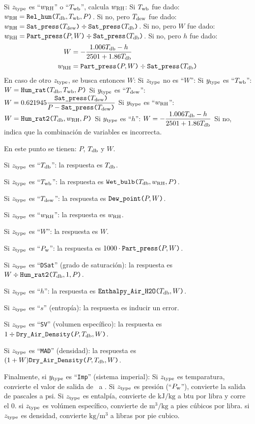 \documentclass[letterpaper]{article}
\newcommand*\Tdb{\ensuremath{T\sub{db}}}
\newcommand*\Twb{\ensuremath{T\sub{wb}}}
\newcommand*\Tdp{\ensuremath{T\sub{dew}}}
\newcommand*\Pw{\ensuremath{P\sub{w}}}
\newcommand*\RH{\ensuremath{w\sub{RH}}}
\begin{document}
Si $z\type$ es ``$\RH$'' o ``$\Twb$'', calcula $\RH$:
\tab Si $\Twb$ fue dado: $\RH=\funcname{Rel\_hum}[\Tdb, \Twb, P]$.
\tab Si no, pero $\Tdp$ fue dado: $\RH=\funcname{Sat\_press}[\Tdp]\div\funcname{Sat\_press}[\Tdb]$.
\tab Si no, pero $W$ fue dado: $\RH=\funcname{Part\_press}[P, W]\div\funcname{Sat\_press}[\Tdb]$.
\tab Si no, pero $h$ fue dado: \begin{align}
	W &= -\frac{1.006 \Tdb - h}{2501 + 1.86 \Tdb} \\
	\RH &= \funcname{Part\_press}[P, W]\div\funcname{Sat\_press}[\Tdb]
\end{align}
En caso de otro $z\type$, se busca entonces $W$:
\tab Si $z\type$ no es ``$W$'':
\tab[2]Si $y\type$ es ``$\Twb$'': $W=\funcname{Hum\_rat}[\Tdb, \Twb, P]$
\tab[2]Si $y\type$ es ``$\Tdp$'': $W=0.621945\dfrac{\funcname{Sat\_press}[\Tdp]}{P-\funcname{Sat\_press}[\Tdp]}$
\tab[2]Si $y\type$ es ``$\RH$'': $W=\funcname{Hum\_rat2}[\Tdb, \RH, P]$
\tab[2]Si $y\type$ es ``$h$'': $W=-\dfrac{1.006 \Tdb - h}{2501 + 1.86 \Tdb}$
\tab Si no, indica que la combinación de variables es incorrecta.

En este punto se tienen: $P$, $\Tdb$ y $W$.

Si $z\type$ es ``$\Tdb$'': la respuesta es $\Tdb$.

Si $z\type$ es ``$\Twb$'': la respuesta es $\funcname{Wet\_bulb}[\Tdb, \RH, P]$.

Si $z\type$ es ``$\Tdp$'': la respuesta es $\funcname{Dew\_point}[P, W]$.

Si $z\type$ es ``$\RH$'': la respuesta es $\RH$.

Si $z\type$ es ``$W$'': la respuesta es $W$.

Si $z\type$ es ``$\Pw$'': la respuesta es $1000\cdot\funcname{Part\_press}[P, W]$.

Si $z\type$ es ``\texttt{DSat}'' (grado de saturación): la respuesta es $W\div\funcname{Hum\_rat2}[\Tdb, 1, P]$.

Si $z\type$ es ``$h$'': la respuesta es $\funcname{Enthalpy\_Air\_H2O}[\Tdb, W]$.

Si $z\type$ es ``$s$'' (entropía): la respuesta es inducir un error.

Si $z\type$ es ``\texttt{SV}'' (volumen específico): la respuesta es $1\div\funcname{Dry\_Air\_Density}[P, \Tdb, W]$.

Si $z\type$ es ``\texttt{MAD}'' (densidad): la respuesta es $(1+W)\funcname{Dry\_Air\_Density}[P, \Tdb, W]$.

\noindent Finalmente, si $y\type$ es ``\texttt{Imp}'' (sistema imperial):
\tab Si $z\type$ es temparatura, convierte el valor de salida de \degC\ a \degF.
\tab Si $z\type$ es presión (``$\Pw$''), convierte la salida de pascales a psi.
\tab Si $z\type$ es entalpía, convierte de $\text{kJ}/\text{kg}$ a btu por libra y corre el 0.
\tab si $z\type$ es volúmen específico, convierte de $\text{m}^3/\text{kg}$ a pies cúbicos por libra.
\tab si $z\type$ es densidad, convierte $\text{kg}/\text{m}^3$ a libras por pie cubico.
\end{document}
